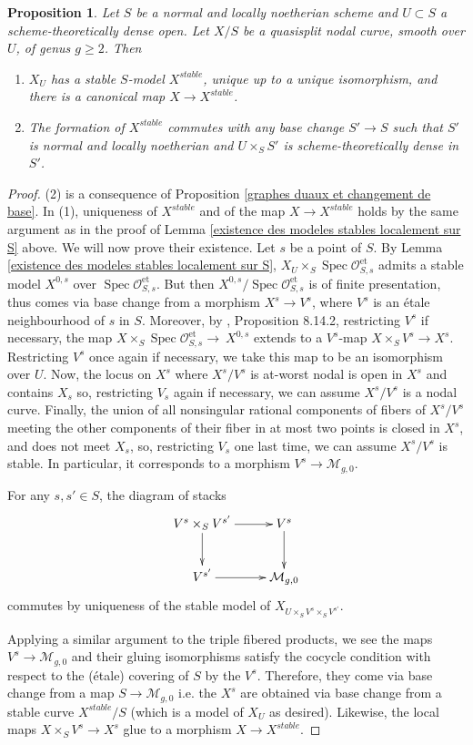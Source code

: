 \documentclass[a4paper,10pt,twoside]{article}
\newcommand{\ra}{\rightarrow}
\newcommand{\on}[1]{\operatorname{#1}}
\renewcommand{\O}{\mathcal{O}}
\DeclareMathOperator{\spec}{Spec}
\newtheorem{prop}[thm]{Proposition}
\theoremstyle{definition}
\theoremstyle{remark}
\renewcommand{\on}[1]{\operatorname{#1}}
\begin{document}
\begin{prop}\label{proposition existence and structure of the stable model}
Let $S$ be a normal and locally noetherian scheme and $U\subset S$ a scheme-theoretically dense open. Let $X/S$ be a quasisplit nodal curve, smooth over $U$, of genus $g\geq 2$. Then
\begin{enumerate}
\item $X_U$ has a stable $S$-model $X^{stable}$, unique up to a unique isomorphism, and there is a canonical map $X\ra X^{stable}$.
\item The formation of $X^{stable}$ commutes with any base change $S'\ra S$ such that $S'$ is normal and locally noetherian and $U\times_S S'$ is scheme-theoretically dense in $S'$.
\end{enumerate}
\end{prop}

\begin{proof}
(2) is a consequence of Proposition \ref{graphes duaux et changement de base}. In (1), uniqueness of $X^{stable}$ and of the map $X\ra X^{stable}$ holds by the same argument as in the proof of Lemma \ref{existence des modeles stables localement sur S} above. We will now prove their existence. Let $s$ be a point of $S$. By Lemma \ref{existence des modeles stables localement sur S}, $X_U\times_S\spec\O_{S,s}^{\on{et}}$ admits a stable model $X^{0,s}$ over $\spec\O_{S,s}^{\on{et}}$. But then $X^{0,s}/\spec\O_{S,s}^{\on{et}}$ is of finite presentation, thus comes via base change from a morphism $X^{s}\ra V^s$, where $V^s$ is an \'etale neighbourhood of $s$ in $S$. Moreover, by \cite{EGA4.3}, Proposition 8.14.2, restricting $V^s$ if necessary, the map $X\times_S\spec\O_{S,s}^{\on{et}}\ra~X^{0,s}$ extends to a $V^s$-map $X\times_S V^s\ra X^s$. Restricting $V^s$ once again if necessary, we take this map to be an isomorphism over $U$. Now, the locus on $X^s$ where $X^s/V^s$ is at-worst nodal is open in $X^s$ and contains $X_s$ so, restricting $V_s$ again if necessary, we can assume $X^s/V^s$ is a nodal curve. Finally, the union of all nonsingular rational components of fibers of $X^s/V^s$ meeting the other components of their fiber in at most two points is closed in $X^s$, and does not meet $X_s$, so, restricting $V_s$ one last time, we can assume $X^s/V^s$ is stable. In particular, it corresponds to a morphism $V^s\ra \mathcal{M}_{g,0}$.

For any $s,s'\in S$, the diagram of stacks
\[
\xymatrix{
V^s\times_S V^{s'}\ar[r]\ar[d]&V^s\ar[d]\\
V^{s'}\ar[r]&\mathcal{M}_{g,0}
}
\]
commutes by uniqueness of the stable model of $X_{U\times_S V^s\times_S V^{s'}}$.

Applying a similar argument to the triple fibered products, we see the maps $V^s\ra \mathcal{M}_{g,0}$ and their gluing isomorphisms satisfy the cocycle condition with respect to the (\'etale) covering of $S$ by the $V^s$. Therefore, they come via base change from a map $S\ra \mathcal{M}_{g,0}$ i.e. the $X^s$ are obtained via base change from a stable curve $X^{stable}/S$ (which is a model of $X_U$ as desired). Likewise, the local maps $X\times_S V^s\ra X^s$ glue to a morphism $X\ra X^{stable}$.
\end{proof}
\end{document}
